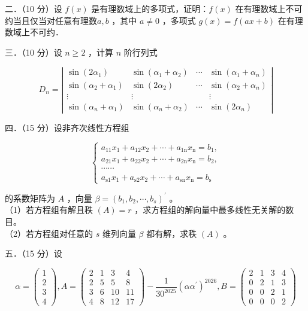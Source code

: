 \documentclass{article}
\begin{document}
二．（10 分）设 \(f(x)\) 是有理数域上的多项式，证明：\(f(x)\) 在有理数域上不可约当且仅当对任意有理数\(a, b\) ，其中 \(a \neq 0\) ，多项式 \(g(x)=f(a x+b)\) 在有理数域上不可约．

三．（10 分）设 \(n \geq 2\) ，计算 \(n\) 阶行列式

\[
D_{n}=\left|\begin{array}{cccc}
\sin \left(2 \alpha_{1}\right) & \sin \left(\alpha_{1}+\alpha_{2}\right) & \cdots & \sin \left(\alpha_{1}+\alpha_{n}\right) \\
\sin \left(\alpha_{2}+\alpha_{1}\right) & \sin \left(2 \alpha_{2}\right) & \cdots & \sin \left(\alpha_{2}+\alpha_{n}\right) \\
\vdots & \vdots & & \vdots \\
\sin \left(\alpha_{n}+\alpha_{1}\right) & \sin \left(\alpha_{n}+\alpha_{2}\right) & \cdots & \sin \left(2 \alpha_{n}\right)
\end{array}\right|
\]

四．（15 分）设非齐次线性方程组

\[
\left\{\begin{array}{c}
a_{11} x_{1}+a_{12} x_{2}+\cdots+a_{1 \mathrm{n}} x_{\mathrm{n}}=b_{1}, \\
a_{21} x_{1}+a_{22} x_{2}+\cdots+a_{2 \mathrm{n}} x_{\mathrm{n}}=b_{2}, \\
\cdots \cdots \\
a_{\mathrm{s} 1} x_{1}+a_{\mathrm{s} 2} x_{2}+\cdots+a_{\mathrm{sn}} x_{\mathrm{n}}=b_{\mathrm{s}}
\end{array}\right.
\]

的系数矩阵为 \(A\) ，向量 \(\beta=\left(b_{1}, b_{2}, \cdots, b_{s}\right)^{\prime}\) 。\\
（1）若方程组有解且秩 \((A)=r\) ，求方程组的解向量中最多线性无关解的数目。\\
（2）若方程组对任意的 \(s\) 维列向量 \(\beta\) 都有解，求秩 \((A)\) 。

五．（15 分）设

\[
\alpha=\left(\begin{array}{l}
1 \\
2 \\
3 \\
4
\end{array}\right), A=\left(\begin{array}{cccc}
2 & 1 & 3 & 4 \\
2 & 5 & 5 & 8 \\
3 & 6 & 10 & 11 \\
4 & 8 & 12 & 17
\end{array}\right)-\frac{1}{30^{2025}}\left(\alpha \alpha^{\prime}\right)^{2026}, B=\left(\begin{array}{cccc}
2 & 1 & 3 & 4 \\
0 & 2 & 1 & 3 \\
0 & 0 & 2 & 1 \\
0 & 0 & 0 & 2
\end{array}\right)
\]
\end{document}
